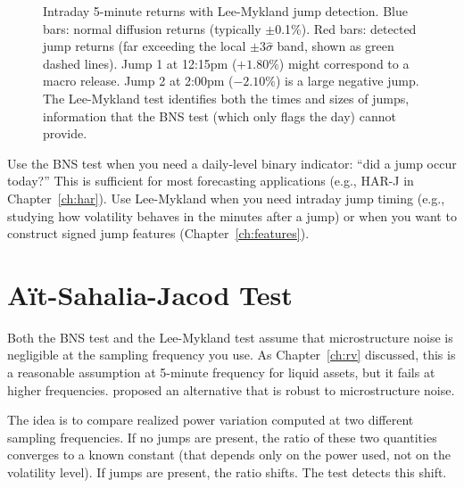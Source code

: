 \begin{figure}[htbp]
\caption{Intraday 5-minute returns with Lee-Mykland jump detection.
Blue bars: normal diffusion returns (typically $\pm$0.1\%).
Red bars: detected jump returns (far exceeding the local $\pm 3\hat{\sigma}$ band, shown as green dashed lines).
Jump 1 at 12:15pm ($+1.80\%$) might correspond to a macro release.
Jump 2 at 2:00pm ($-2.10\%$) is a large negative jump.
The Lee-Mykland test identifies both the times and sizes of jumps, information that the BNS test (which only flags the day) cannot provide.}
\label{fig:lm-detection}
\end{figure}

\begin{keyidea}
Use the BNS test when you need a daily-level binary indicator: ``did a jump occur today?''
This is sufficient for most forecasting applications (e.g., HAR-J in Chapter~\ref{ch:har}).
Use Lee-Mykland when you need intraday jump timing (e.g., studying how volatility behaves in the minutes after a jump) or when you want to construct signed jump features (Chapter~\ref{ch:features}).
\end{keyidea}


\section{A\"it-Sahalia-Jacod Test}
\label{sec:asj-test}

Both the BNS test and the Lee-Mykland test assume that microstructure noise is negligible at the sampling frequency you use.
As Chapter~\ref{ch:rv} discussed, this is a reasonable assumption at 5-minute frequency for liquid assets, but it fails at higher frequencies.
\citet{AitSahaliaJacod2009} proposed an alternative that is robust to microstructure noise.

\begin{intuition}
The idea is to compare realized power variation computed at two different sampling frequencies.
If no jumps are present, the ratio of these two quantities converges to a known constant (that depends only on the power used, not on the volatility level).
If jumps are present, the ratio shifts.
The test detects this shift.
\end{intuition}

